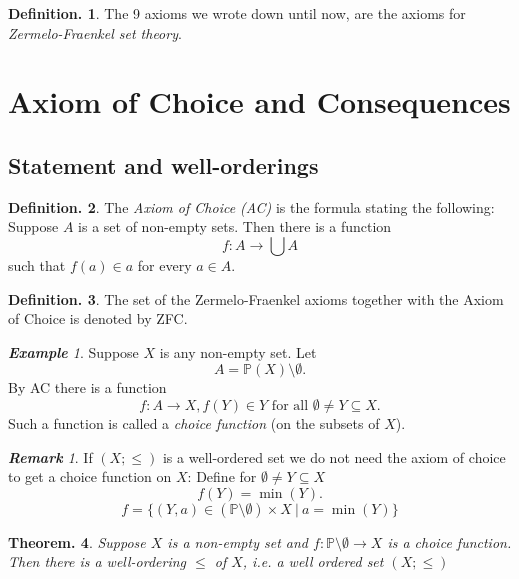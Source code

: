 \documentclass[a4paper,oneside,11pt,DIV=12,parskip=half]{scrartcl}
\theoremstyle{plain}
\newtheorem{theorem}{Theorem.}[section]
\theoremstyle{definition}
\newtheorem{definition}[theorem]{Definition.}
\newtheorem{remark, definition}[theorem]{Remark and Definition.}
\newtheorem{lemma, definition}[theorem]{Lemma and Definition.}
\newtheorem{theorem, definition}[theorem]{Theorem and Definition.}
\theoremstyle{remark}
\newtheorem*{remark}{\textbf{Remark}}
\newtheorem*{example}{\textbf{Example}}
\newtheorem*{remark, example}{\textbf{Remark and Exercise}}
\begin{document}
\begin{definition}

The 9 axioms we wrote down until now, are the axioms for 
\emph{Zermelo-Fraenkel set theory}.

\end{definition}

\section{Axiom of Choice and Consequences}

\subsection{Statement and well-orderings}

\begin{definition}
The \emph{Axiom of Choice (AC)} is the formula stating the following:\\
Suppose $A$ is a set of non-empty sets. Then there is a function
\[ f: A \rightarrow \bigcup A \] such that $f(a) \in a$ for every $a \in A$.
\end{definition}

\begin{definition}
The set of the Zermelo-Fraenkel axioms together with the Axiom of Choice is denoted by ZFC.
\end{definition}
\begin{example}
Suppose $X$ is any non-empty set. Let
\[ A = \mathbb{P}(X) \setminus \emptyset .\]
By AC there is a function
\[ f: A \rightarrow X, f(Y) \in Y \text{ for all } \emptyset \neq Y \subseteq X. \]
Such a function is called a \emph{choice function} (on the subsets of $X$).
\end{example}

\begin{remark}
If $(X;\leq)$ is a well-ordered set we do not need the axiom of choice to get a choice function on $X$: 
Define for $\emptyset \neq Y \subseteq X$
\[ f(Y) = \min(Y). \]
\[ f= \{ (Y,a) \in (\mathbb{P} \setminus \emptyset) \times X ~|~ a = \min(Y) \} \]
\end{remark}

\begin{theorem}
Suppose $X$ is a non-empty set and $f: \mathbb{P} \setminus \emptyset \rightarrow X$ is a choice function. Then there is a well-ordering $\leq$ of $X$, i.e. a well ordered set $(X;\leq)$
\end{theorem}
\end{document}
